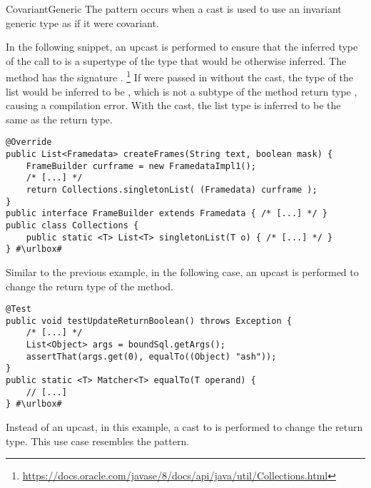\begin{pattern}{CovariantGeneric}
The \thisp{} pattern occurs when a cast is used to use an invariant generic type as if it were covariant.

\instances{}
In the following snippet,
an upcast is performed to ensure that the inferred type of the call to  is a supertype of the type that would be otherwise inferred.
The  method has the signature .%
\footnote{\url{https://docs.oracle.com/javase/8/docs/api/java/util/Collections.html}}
If  were passed in without the cast,
the type of the list would be inferred to be ,
which is not a subtype of the method return type ,
causing a compilation error.
With the cast, the list type is inferred to be the same as the return type.

\def\urlvar{http://bit.ly/arpruss_raspberryjammod_2USL7Ai}
\begin{verbatim}
@Override
public List<Framedata> createFrames(String text, boolean mask) {
    FrameBuilder curframe = new FramedataImpl1();
    /* [...] */
    return Collections.singletonList( (Framedata) curframe );
}
public interface FrameBuilder extends Framedata { /* [...] */ }
public class Collections {
    public static <T> List<T> singletonList(T o) { /* [...] */ }
} #\urlbox#
\end{verbatim}

Similar to the previous example, in the following case,
an upcast is performed to change the return type of the
 method.

\def\urlvar{http://bit.ly/jfaster_mango_2EhXzUW}
\begin{verbatim}
@Test
public void testUpdateReturnBoolean() throws Exception {
    /* [...] */
    List<Object> args = boundSql.getArgs();
    assertThat(args.get(0), equalTo((Object) "ash"));
}
public static <T> Matcher<T> equalTo(T operand) {
    // [...]
} #\urlbox#
\end{verbatim}

Instead of an upcast, in this example,
a cast to  is performed to change the return type.
This use case resembles the  pattern.


\end{pattern}
